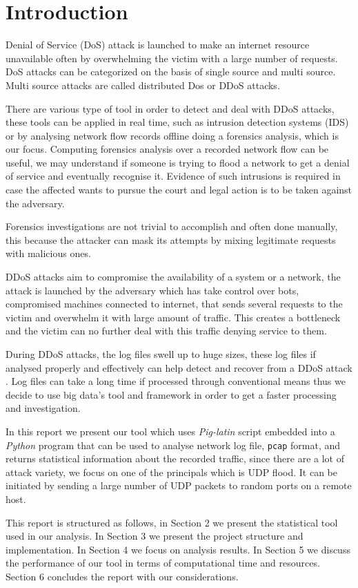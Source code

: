 \section{Introduction}
Denial of Service (DoS) attack is launched to make an internet resource unavailable often by overwhelming the victim with a large number of requests. DoS attacks can be categorized on the basis of single source and multi source. Multi source attacks are called distributed Dos or DDoS attacks\cite{ddos_forensics}.
 
There are various type of tool in order to detect and deal with DDoS attacks, these tools can be applied in real time, such as intrusion detection systems (IDS) or by analysing network flow records offline doing a forensics analysis, which is our focus.
Computing forensics analysis over a recorded network flow can be useful, we may understand if someone is trying to flood a network to get a denial of service and eventually recognise it.
Evidence of such intrusions is required in case the affected wants to pursue the court and legal action is to be taken against the adversary.

Forensics investigations are not trivial to accomplish and often done manually, this because the attacker can mask its attempts by mixing legitimate requests with malicious ones.

DDoS attacks aim to compromise the availability of a system or a network, the attack is launched by the adversary which has take control over bots, compromised machines connected to internet, that sends several requests to the victim and overwhelm it with large amount of traffic. This creates a bottleneck and the victim can no further deal with this traffic denying service to them.

During DDoS attacks, the log files swell up to huge sizes, these log files if analysed properly and effectively can help detect and recover from a DDoS attack \cite{ddos_forensics}. Log files can take a long time if processed through conventional means thus we decide to use big data's tool and framework in order to get a faster processing and investigation.

In this report we present our tool which uses \textit{Pig-latin} script embedded into a \textit{Python} program that can be used to analyse network log file, \texttt{pcap} format\cite{wireshrk_pcap}, and returns statistical information about the recorded traffic, since there are a lot of attack variety, we focus on one of the principals which is UDP flood. 
It can be initiated by sending a large number of UDP packets to random ports on a remote host.

This report is structured as follows, in Section 2 we present the statistical tool used in our analysis. In Section 3 we present the project structure and implementation. In Section 4 we focus on analysis results. In Section 5 we discuss the performance of our tool in terms of computational time and resources. Section 6 concludes the report with our considerations.  